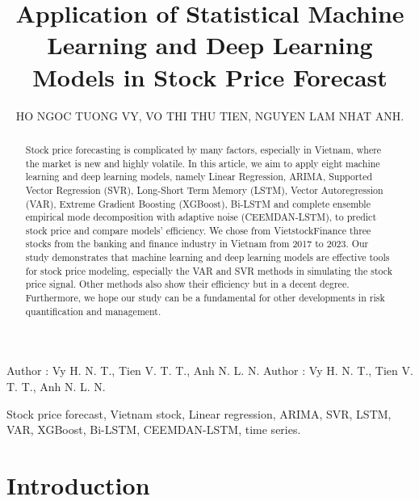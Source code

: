 \documentclass{ieeeojies}
\begin{document}
\title{Application of Statistical Machine Learning and Deep Learning Models in Stock Price Forecast}
\author{\uppercase{Ho Ngoc Tuong Vy},
\uppercase{Vo Thi Thu Tien, Nguyen Lam Nhat Anh}.
\address[1]{University of Information Technology, Ho Chi Minh City, Vietnam (e-mail: 21521685@gm.uit.edu.vn)}
\address[2]{University of Information Technology, Ho Chi Minh City, Vietnam (e-mail: 21520482@gm.uit.edu.vn)}
\address[3]{University of Information Technology, Ho Chi Minh City, Vietnam (e-mail: 21521832@gm.uit.edu.vn)}
}
\markboth
{Author \headeretal: Vy H. N. T., Tien V. T. T., Anh N. L. N.}
{Author \headeretal: Vy H. N. T., Tien V. T. T., Anh N. L. N.}
\begin{abstract}
Stock price forecasting is complicated by many factors, especially in Vietnam, where the market is new and highly volatile. In this article, we aim to apply eight machine learning and deep learning models, namely Linear Regression, ARIMA, Supported Vector Regression (SVR), Long-Short Term Memory (LSTM), Vector Autoregression (VAR), Extreme Gradient Boosting (XGBoost), Bi-LSTM and complete ensemble empirical mode decomposition with adaptive noise (CEEMDAN-LSTM), to predict stock price and compare models' efficiency. We chose from VietstockFinance three stocks from the banking and finance industry in Vietnam from 2017 to 2023. Our study demonstrates that machine learning and deep learning models are effective tools for stock price modeling, especially the VAR and SVR methods in simulating the stock price signal. Other methods also show their efficiency but in a decent degree. Furthermore, we hope our study can be a fundamental for other developments in risk quantification and management.
\end{abstract}


\begin{keywords}
Stock price forecast, Vietnam stock, Linear regression, ARIMA, SVR, LSTM, VAR, XGBoost, Bi-LSTM, CEEMDAN-LSTM, time series.
\end{keywords}

\titlepgskip=-15pt

\maketitle

\section{Introduction}
\end{document}
